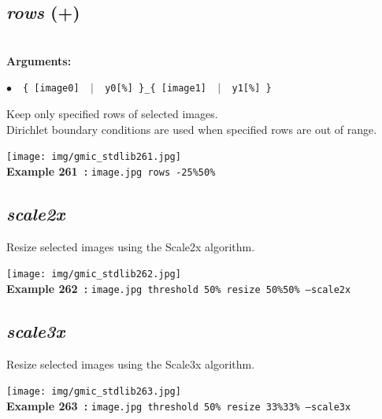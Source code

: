 \documentclass[a4paper,10.5pt,twoside]{book}
\def\comma{\discretionary{,}{}{,}}
\newcommand{\Cb}[1]{\textcolor{cb}{#1}}
\begin{document}
\subsection{\emph{rows} (+)}\vspace*{-0.7em}
~\\\textbf{\Cb{Arguments: }}\begin{flushleft}
{\small \Cb{\hspace*{0.5cm}$\bullet$~~\texttt{\{ [image0] ~$|$~ y0[\%] \}{\comma}\_\{ [image1] ~$|$~ y1[\%] \}}}}\end{flushleft}
Keep only specified rows of selected images.
~\\Dirichlet boundary conditions are used when specified rows are out of range.
\begin{center}\texttt{[image: img/gmic\_stdlib261.jpg]}\\
{\footnotesize \textbf{Example 261~:} \texttt{image.jpg rows -25\%{\comma}50\%}}
\end{center}

\subsection{\emph{scale2x} }\vspace*{-0.7em}
Resize selected images using the Scale2x algorithm.
\begin{center}\texttt{[image: img/gmic\_stdlib262.jpg]}\\
{\footnotesize \textbf{Example 262~:} \texttt{image.jpg threshold 50\% resize 50\%{\comma}50\% --scale2x}}
\end{center}

\subsection{\emph{scale3x} }\vspace*{-0.7em}
Resize selected images using the Scale3x algorithm.
\begin{center}\texttt{[image: img/gmic\_stdlib263.jpg]}\\
{\footnotesize \textbf{Example 263~:} \texttt{image.jpg threshold 50\% resize 33\%{\comma}33\% --scale3x}}
\end{center}
\end{document}
